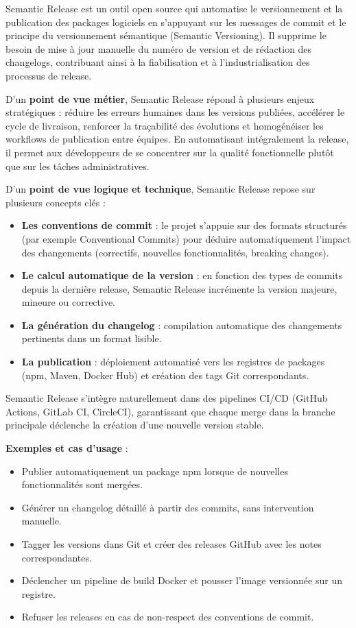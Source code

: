 Semantic Release est un outil open source qui automatise le versionnement et la publication des packages logiciels en s’appuyant sur les messages de commit et le principe du versionnement sémantique (Semantic Versioning). Il supprime le besoin de mise à jour manuelle du numéro de version et de rédaction des changelogs, contribuant ainsi à la fiabilisation et à l’industrialisation des processus de release.

D’un \textbf{point de vue métier}, Semantic Release répond à plusieurs enjeux stratégiques  : réduire les erreurs humaines dans les versions publiées, accélérer le cycle de livraison, renforcer la traçabilité des évolutions et homogénéiser les workflows de publication entre équipes. En automatisant intégralement la release, il permet aux développeurs de se concentrer sur la qualité fonctionnelle plutôt que sur les tâches administratives.

D’un \textbf{point de vue logique et technique}, Semantic Release repose sur plusieurs concepts clés  :
\begin{itemize}
	\item \textbf{Les conventions de commit}  : le projet s’appuie sur des formats structurés (par exemple Conventional Commits) pour déduire automatiquement l’impact des changements (correctifs, nouvelles fonctionnalités, breaking changes).
	\item \textbf{Le calcul automatique de la version}  : en fonction des types de commits depuis la dernière release, Semantic Release incrémente la version majeure, mineure ou corrective.
	\item \textbf{La génération du changelog}  : compilation automatique des changements pertinents dans un format lisible.
	\item \textbf{La publication}  : déploiement automatisé vers les registres de packages (npm, Maven, Docker Hub) et création des tags Git correspondants.
\end{itemize}

Semantic Release s’intègre naturellement dans des pipelines CI/CD (GitHub Actions, GitLab CI, CircleCI), garantissant que chaque merge dans la branche principale déclenche la création d’une nouvelle version stable.

\textbf{Exemples et cas d’usage} :
\begin{itemize}
	\item Publier automatiquement un package npm lorsque de nouvelles fonctionnalités sont mergées.
	\item Générer un changelog détaillé à partir des commits, sans intervention manuelle.
	\item Tagger les versions dans Git et créer des releases GitHub avec les notes correspondantes.
	\item Déclencher un pipeline de build Docker et pousser l’image versionnée sur un registre.
	\item Refuser les releases en cas de non-respect des conventions de commit.
\end{itemize}

